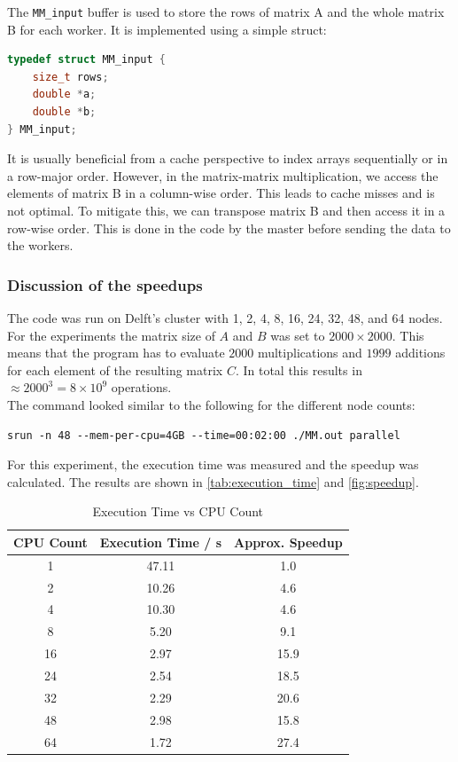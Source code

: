 The \texttt{MM\_input} buffer is used to store the rows of matrix A and the whole matrix B for each worker. It is implemented using a simple struct:
\begin{lstlisting}[language=c]
typedef struct MM_input {
    size_t rows;
    double *a;
    double *b;
} MM_input;
\end{lstlisting}

 It is usually beneficial from a cache perspective to index arrays sequentially or in a row-major order. However, in the matrix-matrix multiplication, we access the elements of matrix B in a column-wise order. This leads to cache misses and is not optimal. To mitigate this, we can transpose matrix B and then access it in a row-wise order. This is done in the code by the master before sending the data to the workers.

\subsubsection*{Discussion of the speedups}
The code was run on Delft's cluster with 1, 2, 4, 8, 16, 24, 32, 48, and 64 nodes. For the experiments the matrix size of $A$ and $B$ was set to $2000\times2000$. 
This means that the program has to evaluate $2000$ multiplications and $1999$ additions for each element of the resulting matrix $C$. In total this results in $\approx 2000^3 = 8 \times 10^9$ operations.\\
The command looked similar to the following for the different node counts:
\begin{verbatim}
srun -n 48 --mem-per-cpu=4GB --time=00:02:00 ./MM.out parallel
\end{verbatim}
For this experiment, the execution time was measured and the speedup was calculated. The results are shown in \autoref{tab:execution_time} and \autoref{fig:speedup}.

\begin{table}[h!]
    \centering
    \begin{tabular}{|c|c|c|}
        \hline
        \textbf{CPU Count} & \textbf{Execution Time / s} & \textbf{Approx. Speedup} \\ 
        \hline
        1   & 47.11  & 1.0 \\ 
        2   & 10.26  & 4.6 \\ 
        4   & 10.30  & 4.6 \\ 
        8   &  5.20  & 9.1 \\ 
        16  &  2.97  & 15.9 \\ 
        24  &  2.54  & 18.5 \\ 
        32  &  2.29  & 20.6 \\ 
        48  &  2.98  & 15.8 \\ 
        64  &  1.72  & 27.4 \\ 
        \hline
    \end{tabular}
    \caption{Execution Time vs CPU Count}
    \label{tab:execution_time}
\end{table}

